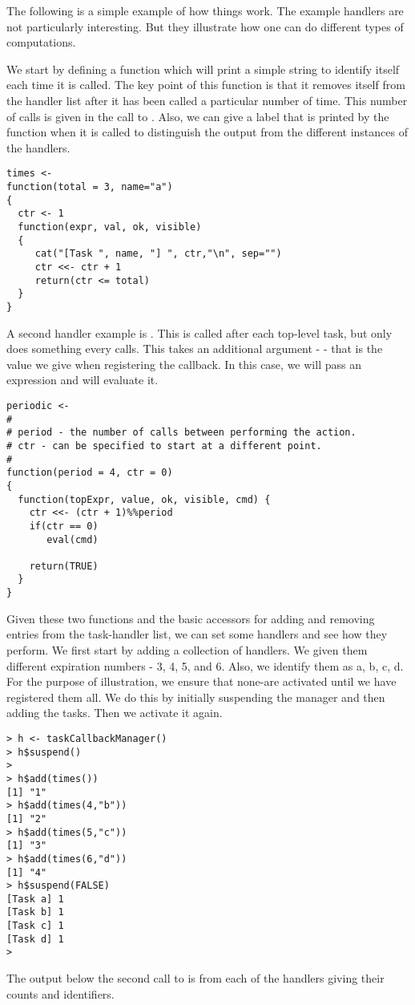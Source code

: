 \documentclass{article}
\begin{document}
The following is a simple example of how things work.  The example
handlers are not particularly interesting.  But they illustrate
how one can do different types of computations.

We start by defining a  function which will print a
simple string to identify itself each time it is called. The key point
of this function is that it removes itself from the handler list after
it has been called a particular number of time.  This number of calls
is given in the call to . Also, we can give a label
that is printed by the function when it is called to distinguish the
output from the different instances of the handlers.

\begin{verbatim}
times <-
function(total = 3, name="a")
{
  ctr <- 1
  function(expr, val, ok, visible)
  {
     cat("[Task ", name, "] ", ctr,"\n", sep="")
     ctr <<- ctr + 1
     return(ctr <= total)
  }
}
\end{verbatim}

A second handler example is .  This is called
after each top-level task, but only does something every 
calls.  This takes an additional argument -  - that is the
value we give when registering the callback. In this case, we will
pass an expression and  will evaluate it.
\begin{verbatim}
periodic <-
#
# period - the number of calls between performing the action.
# ctr - can be specified to start at a different point.
#
function(period = 4, ctr = 0)  
{
  function(topExpr, value, ok, visible, cmd) {
    ctr <<- (ctr + 1)%%period
    if(ctr == 0)
       eval(cmd)

    return(TRUE)
  }
}
\end{verbatim}

Given these two functions and the basic accessors for adding and
removing entries from the task-handler list, we can set some handlers
and see how they perform.  We first start by adding a collection of
 handlers. We given them different expiration numbers
- 3, 4, 5, and 6. Also, we identify them as a, b, c, d.  For the
purpose of illustration, we ensure that none-are activated until we
have registered them all. We do this by initially suspending 
the manager and then adding the tasks. Then we activate it again.

\begin{verbatim}
> h <- taskCallbackManager()
> h$suspend()
> 
> h$add(times())
[1] "1"
> h$add(times(4,"b"))
[1] "2"
> h$add(times(5,"c"))
[1] "3"
> h$add(times(6,"d"))
[1] "4"
> h$suspend(FALSE)
[Task a] 1
[Task b] 1
[Task c] 1
[Task d] 1
> 
\end{verbatim}
The output below the second call to  is from each
of the handlers giving their counts and identifiers.
\end{document}
